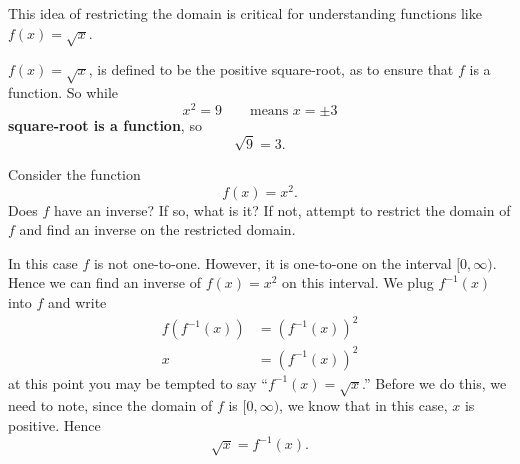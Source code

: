 \documentclass{ximera}
\begin{document}
This idea of restricting the domain is critical for understanding
functions like $f(x) = \sqrt{x}$.

\begin{warning}
  $f(x) = \sqrt{x}$, is defined to be the positive square-root, as to
  ensure that $f$ is a function. So while
  \[
  x^2 = 9\qquad\text{means $x=\pm 3$}
  \]
  \textbf{square-root is a function}, so
  \[
  \sqrt{9}  =3.
  \]
\end{warning}


\begin{example}
Consider the function
\[
f(x) = x^2.
\]
Does $f$ have an inverse? If so, what is it? If not, attempt to
restrict the domain of $f$ and find an inverse on the restricted
domain.
\begin{explanation}
In this case $f$ is not one-to-one. However, it is one-to-one on the
interval $[0,\infty)$. Hence we can find an inverse of $f(x)=x^2$ on
  this interval. We plug $f^{-1}(x)$ into $f$ and write
  \begin{align*}
    f(f^{-1}(x)) &= \left(f^{-1}(x)\right)^2\\
    x &= \left(f^{-1}(x)\right)^2
  \end{align*}
  at this point you may be tempted to say ``$f^{-1}(x) = \sqrt{x}$.''
  Before we do this, we need to note, since the domain of $f$ is
  $[0,\infty)$, we know that in this case, $x$ is positive. Hence
    \[
    \sqrt{x} = f^{-1}(x).
    \]
    \begin{image}
\end{image}
\end{explanation}
\end{example}
\end{document}
